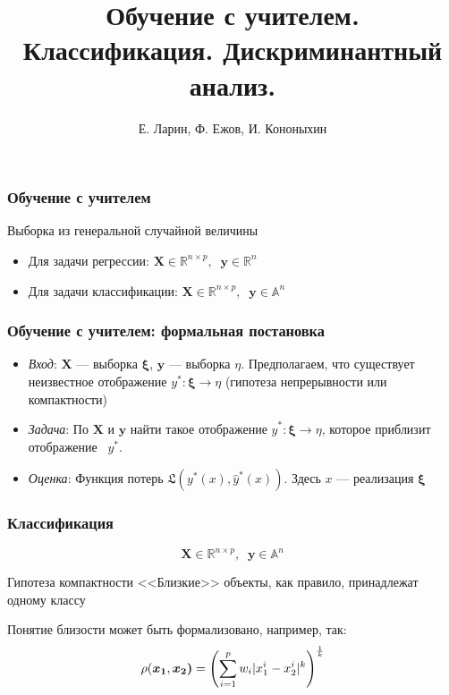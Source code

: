 \documentclass[11pt]{beamer}
\begin{document}
	\author{Е. Ларин, Ф. Ежов, И. Кононыхин }
	\title{Обучение с учителем. Классификация. Дискриминантный анализ. }
	\date{}
	\subject{Семинар по статистическому и машинному обучению}
	\begin{frame}[plain]
		\maketitle 
	\end{frame}
	
	\begin{frame}
		\frametitle{Обучение с учителем}
		
		Выборка из генеральной случайной величины
		\begin{itemize}
			\item Для задачи регрессии: $\bm{X} \in \mathbb{R}^{n\times p}, \;\;\mathbf{y}\in \mathbb{R}^n$
		    \item Для задачи классификации: $\bm{X} \in \mathbb{R}^{n\times p}, \;\;\mathbf{y}\in \mathbb{A}^n$
        \end{itemize}
		
	\end{frame}
	\begin{frame}
		\frametitle{Обучение с учителем: формальная постановка}
		\begin{itemize}
			\item \textit{Вход}: $\bm{X}$ --- выборка $\bm{\xi}$, $\bm{y}$ --- выборка $\eta$. Предполагаем, что существует неизвестное отображение $y^*: \bm{\xi} \to \eta$  (гипотеза непрерывности или компактности)
			
			\item \textit{Задача}: По $\bm{X}$ и $\bm{y}$ найти такое отображение $\hat{y}^*: \bm{\xi} \to \eta$, которое приблизит отображение  $y^*$. 
			
			\item \textit{Оценка}: Функция потерь $\mathfrak{L}(y^*(x), \hat{y}^*(x))$. Здесь $x$ --- реализация $\bm{\xi}$
		\end{itemize}
	\end{frame}
	
	\begin{frame}
		\frametitle{Классификация}
		\begin{equation}
			\bm{X} \in \mathbb{R}^{n\times p}, \;\;\mathbf{y}\in \mathbb{A}^n
		\end{equation}
		\begin{block}{Гипотеза компактности}
			<<Близкие>> объекты, как правило, принадлежат одному классу
		\end{block}
		Понятие близости может быть формализовано, например, так:
		$$\rho(\bm{x_1}, \bm{x_2)} = \left(\displaystyle{\sum_{i = 1}^p w_i|x_1^i - x_2^i|^k}\right)^{{1}\over {k}}$$
	\end{frame}
\end{document}
